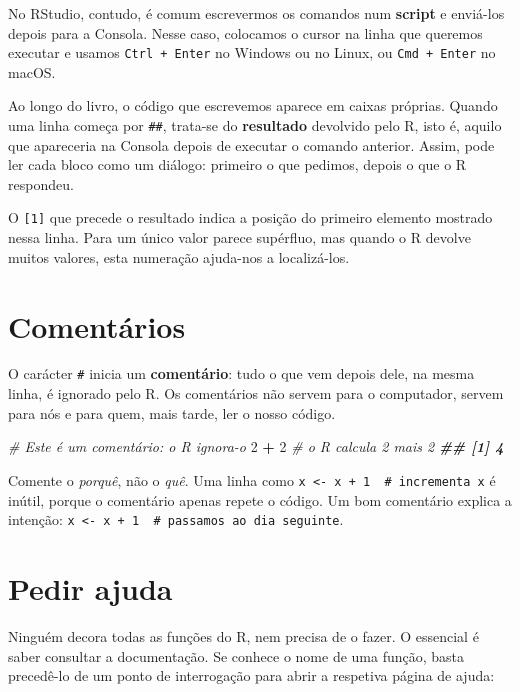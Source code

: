 \documentclass[
  portuguese,
  11pt,
  openany]{book}
\newenvironment{Shaded}{\begin{snugshade}}{\end{snugshade}}
\newcommand{\CommentTok}[1]{\textcolor[rgb]{0.56,0.35,0.01}{\textit{#1}}}
\newcommand{\DecValTok}[1]{\textcolor[rgb]{0.00,0.00,0.81}{#1}}
\newcommand{\DocumentationTok}[1]{\textcolor[rgb]{0.56,0.35,0.01}{\textbf{\textit{#1}}}}
\newcommand{\SpecialCharTok}[1]{\textcolor[rgb]{0.81,0.36,0.00}{\textbf{#1}}}
\begin{document}
No RStudio, contudo, é comum escrevermos os comandos num \textbf{script} e enviá-los depois para a Consola. Nesse caso, colocamos o cursor na linha que queremos executar e usamos \texttt{Ctrl\ +\ Enter} no Windows ou no Linux, ou \texttt{Cmd\ +\ Enter} no macOS.

Ao longo do livro, o código que escrevemos aparece em caixas próprias. Quando uma linha começa por \texttt{\#\#}, trata-se do \textbf{resultado} devolvido pelo R, isto é, aquilo que apareceria na Consola depois de executar o comando anterior. Assim, pode ler cada bloco como um diálogo: primeiro o que pedimos, depois o que o R respondeu.

O \texttt{{[}1{]}} que precede o resultado indica a posição do primeiro elemento mostrado nessa linha. Para um único valor parece supérfluo, mas quando o R devolve muitos valores, esta numeração ajuda-nos a localizá-los.

\section{Comentários}\label{comentuxe1rios}

O carácter \texttt{\#} inicia um \textbf{comentário}: tudo o que vem depois dele, na mesma linha, é ignorado pelo R. Os comentários não servem para o computador, servem para nós e para quem, mais tarde, ler o nosso código.

\begin{Shaded}
\begin{Highlighting}[]
\CommentTok{\# Este é um comentário: o R ignora{-}o}
\DecValTok{2} \SpecialCharTok{+} \DecValTok{2}   \CommentTok{\# o R calcula 2 mais 2}
\DocumentationTok{\#\# [1] 4}
\end{Highlighting}
\end{Shaded}

Comente o \emph{porquê}, não o \emph{quê}. Uma linha como \texttt{x\ \textless{}-\ x\ +\ 1\ \ \#\ incrementa\ x} é inútil, porque o comentário apenas repete o código. Um bom comentário explica a intenção: \texttt{x\ \textless{}-\ x\ +\ 1\ \ \#\ passamos\ ao\ dia\ seguinte}.

\section{Pedir ajuda}\label{pedir-ajuda}

Ninguém decora todas as funções do R, nem precisa de o fazer. O essencial é saber consultar a documentação. Se conhece o nome de uma função, basta precedê-lo de um ponto de interrogação para abrir a respetiva página de ajuda:
\end{document}
